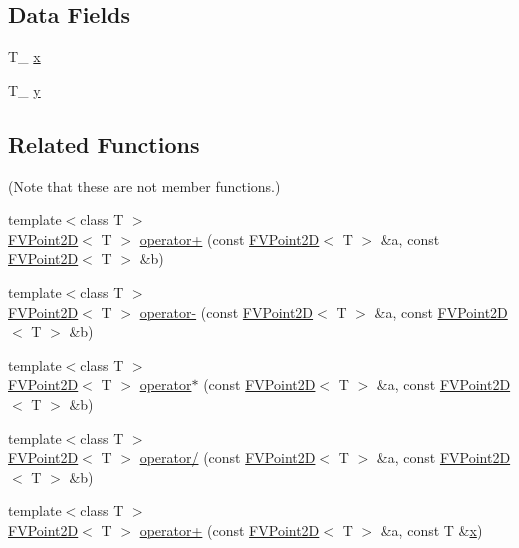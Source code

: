 \subsection*{Data Fields}
\begin{DoxyCompactItemize}
\item 
T\_\- \hyperlink{classFVPoint2D_a4333b1040efe8cd32f7c76bfc2269e0d}{x}
\item 
T\_\- \hyperlink{classFVPoint2D_ab4943c75e718fe503722ac7d26c746a6}{y}
\end{DoxyCompactItemize}
\subsection*{Related Functions}
(Note that these are not member functions.) \begin{DoxyCompactItemize}
\item 
{\footnotesize template$<$class T $>$ }\\\hyperlink{classFVPoint2D}{FVPoint2D}$<$ T $>$ \hyperlink{classFVPoint2D_af8f481fb9e7a476e2f5148f01f36a05a}{operator+} (const \hyperlink{classFVPoint2D}{FVPoint2D}$<$ T $>$ \&a, const \hyperlink{classFVPoint2D}{FVPoint2D}$<$ T $>$ \&b)
\item 
{\footnotesize template$<$class T $>$ }\\\hyperlink{classFVPoint2D}{FVPoint2D}$<$ T $>$ \hyperlink{classFVPoint2D_a5f264c9cef903053a216a56c65d9249e}{operator-\/} (const \hyperlink{classFVPoint2D}{FVPoint2D}$<$ T $>$ \&a, const \hyperlink{classFVPoint2D}{FVPoint2D}$<$ T $>$ \&b)
\item 
{\footnotesize template$<$class T $>$ }\\\hyperlink{classFVPoint2D}{FVPoint2D}$<$ T $>$ \hyperlink{classFVPoint2D_a04bc7e803d73ef330131856d6105c730}{operator$\ast$} (const \hyperlink{classFVPoint2D}{FVPoint2D}$<$ T $>$ \&a, const \hyperlink{classFVPoint2D}{FVPoint2D}$<$ T $>$ \&b)
\item 
{\footnotesize template$<$class T $>$ }\\\hyperlink{classFVPoint2D}{FVPoint2D}$<$ T $>$ \hyperlink{classFVPoint2D_a7cf0bdae41a03ea052321be2e9d71692}{operator/} (const \hyperlink{classFVPoint2D}{FVPoint2D}$<$ T $>$ \&a, const \hyperlink{classFVPoint2D}{FVPoint2D}$<$ T $>$ \&b)
\item 
{\footnotesize template$<$class T $>$ }\\\hyperlink{classFVPoint2D}{FVPoint2D}$<$ T $>$ \hyperlink{classFVPoint2D_a93156f566b5920e9bc7989d0600a5012}{operator+} (const \hyperlink{classFVPoint2D}{FVPoint2D}$<$ T $>$ \&a, const T \&\hyperlink{classFVPoint2D_a4333b1040efe8cd32f7c76bfc2269e0d}{x})

\end{DoxyCompactItemize}
